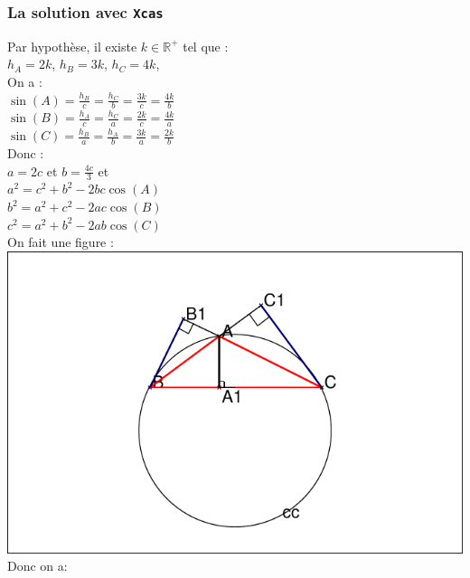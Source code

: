 \documentclass[a4paper,11pt]{book}
\newcommand{\R}{{\mathbb{R}}}
\begin{document}
\subsubsection{La solution avec {\tt Xcas}}
Par hypoth\`ese, il existe $k\in \R^+$ tel que :\\
$h_A=2k$, $h_B=3k$, $h_C=4k$,\\
On a :\\
$\displaystyle \sin(A)=\frac{h_B}{c}=\frac{h_C}{b}=\frac{3k}{c}=\frac{4k}{b}$\\
$\displaystyle \sin(B)=\frac{h_A}{c}=\frac{h_C}{a}=\frac{2k}{c}=\frac{4k}{a}$\\
$\displaystyle \sin(C)=\frac{h_B}{a}=\frac{h_A}{b}=\frac{3k}{a}=\frac{2k}{b}$\\
Donc :\\
$a=2c$ et $b=\frac{4c}{3}$ et\\
$a^2=c^2+b^2-2bc\cos(A)$ \\
$b^2=a^2+c^2-2ac\cos(B)$ \\
$c^2=a^2+b^2-2ab\cos(C)$ \\
On fait une figure  :\\
\includegraphics[width=\textwidth]{baceinst0}\\
Donc on a:
\end{document}
